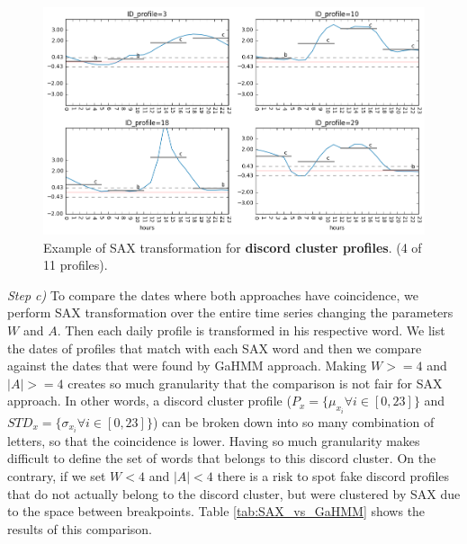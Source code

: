 \begin{figure}[h!]
  \vspace{0.5em} %
  \includegraphics[scale=0.65]{Figures/discord_candidates_sax.jpg}
  \caption{Example of SAX transformation for \textbf{discord cluster profiles}. (4 of 11 profiles).}
  \label{fig:discord_candidates_sax}
\end{figure}


\textit{Step c)} To compare the dates where both approaches have coincidence, we perform SAX transformation over the entire time series changing the parameters $W$ and $A$. Then each daily profile is transformed in his respective word. We list the dates of profiles that match with each SAX word and then we compare against the dates that were found by GaHMM approach. Making $W >= 4$ and $|A| >=4 $ creates so much granularity that the comparison is not fair for SAX approach. In other words, a discord cluster profile ($P_x = \{ \mu_{x_i} \forall i \in [0,23] \}$  and $STD_x = \{ \sigma_{x_i} \forall i \in [0,23] \}$) can be broken down into so many combination of letters, so that the coincidence is lower. Having so much granularity makes difficult to define the set of words that belongs to this discord cluster. On the contrary, if we set $W<4$ and $|A|<4$ there is a risk to spot fake discord profiles that do not actually belong to the discord cluster, but were clustered by SAX due to the space between breakpoints. Table \ref{tab:SAX_vs_GaHMM} shows the results of this comparison.


